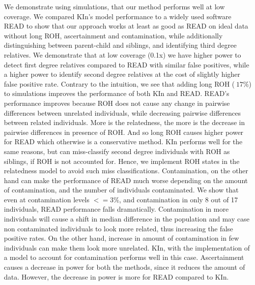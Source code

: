 \documentclass[12pt, letterpaper]{article}
\begin{document}
We demonstrate using simulations, that our method performs well at low coverage. We compared KIn's model performance to a widely used software READ to show that our approach works at least as good as READ on ideal data without long ROH, ascertainment and contamination, while additionally distinguishing between parent-child and siblings, and identifying third degree relatives. We demonstrate that at low coverage (0.1x) we have higher power to detect first degree relatives compared to READ with similar false positives, while a higher power to identify second degree relatives at the cost of slightly higher false positive rate. Contrary to the intuition, we see that adding long ROH ($~17\%$) to simulations improves the performance of both KIn and READ. READ's performance improves because ROH does not cause any change in pairwise differences between unrelated individuals, while decreasing pairwise differences between related individuals. More is the relatedness, the more is the decrease in pairwise differences in presence of ROH. And so long ROH causes higher power for READ which otherwise is a conservative method. KIn performs well for the same reasons, but can miss-classify second degree individuals with ROH as siblings, if ROH is not accounted for. Hence, we implement ROH states in the relatedness model to avoid such miss classifications. Contamination, on the other hand can make the performance of READ much worse depending on the amount of contamination, and the number of individuals contaminated. We show that even at contamination levels  $<=3\%$, and contamination in only 8 out of 17 individuals, READ performance falls dramatically. Contamination in more individuals will cause a shift in median difference in the population and may case non contaminated individuals to look more related, thus increasing the false positive rates. On the other hand, increase in amount of contamination in few individuals can make them look more unrelated. KIn, with the implementation of a model to account for contamination performs well in this case. Ascertainment causes a decrease in power for both the methods, since it reduces the amount of data. However, the decrease in power is more for READ compared to KIn.
\end{document}
